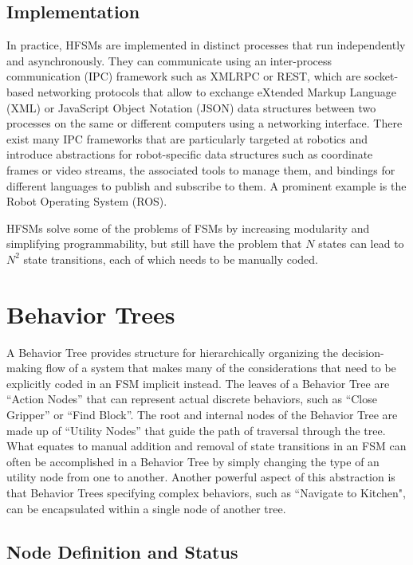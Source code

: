 \subsection{Implementation}

In practice, HFSMs are implemented in distinct processes that run independently and asynchronously. They can communicate using an inter-process communication (IPC) framework  such as XMLRPC or REST, which are socket-based networking protocols that allow to exchange eXtended Markup Language (XML) or JavaScript Object Notation (JSON) data structures between two processes on the same or different computers using a networking interface.
%
There exist many IPC frameworks that are particularly targeted at robotics and introduce abstractions for robot-specific data structures such as coordinate frames or video streams, the associated tools to manage them, and bindings for different languages to publish and subscribe to them. A prominent example is the Robot Operating System (ROS).

HFSMs solve some of the problems of FSMs by increasing modularity and simplifying programmability, but still have the problem that $N$ states can lead to $N^2$ state transitions, each of which needs to be manually coded.

\section{Behavior Trees}\label{sec:behaviortrees}

A Behavior Tree \cite{colledanchise2018behavior} provides structure for hierarchically organizing the decision-making flow of a system that makes many of the considerations that need to be explicitly coded in an FSM implicit instead. The leaves of a Behavior Tree are ``Action Nodes'' that can represent actual discrete behaviors, such as ``Close Gripper'' or ``Find Block''. The root and internal nodes of the Behavior Tree are made up of ``Utility Nodes'' that guide the path of traversal through the tree.
What equates to manual addition and removal of state transitions in an FSM can often be accomplished in a Behavior Tree by simply changing the type of an utility node from one to another. Another powerful aspect of this abstraction is that Behavior Trees specifying complex behaviors, such as ``Navigate to Kitchen", can be encapsulated within a single node of another tree.

\subsection{Node Definition and Status}

